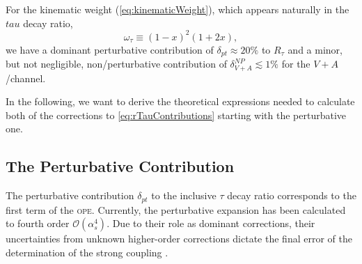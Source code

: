 \documentclass[../../index.tex]{subfiles}
\begin{document}
For the kinematic weight (\cref{eq:kinematicWeight}), which appears naturally in the \(tau\) decay ratio,
\begin{equation}
  \omega_\tau \equiv (1-x)^2(1+2x),
\end{equation}
we have a dominant perturbative contribution of \(\delta_{pt} \approx 20\%\) to
\(R_\tau\) \cite{Pich2013} and a minor, but not negligible, non\-/perturbative
contribution of \(\delta_{V+A}^{NP} \lesssim 1\% \) \cite{Jamin2013} for the
\(V+A\)\-/channel.

In the following, we want to derive the theoretical expressions needed to
calculate both of the corrections to \cref{eq:rTauContributions} starting with
the perturbative one.


\subsection{The Perturbative Contribution}
The perturbative contribution \(\delta_{pt}\) to the inclusive \(\tau\) decay
ratio corresponds to the first term of the \textsc{ope}. Currently, the
perturbative expansion has been calculated to fourth order
\(\mathcal{O}(\alpha_s^4)\). Due to their role as dominant corrections, their
uncertainties from unknown higher-order corrections dictate the final error of
the determination of the strong coupling \cite{Pich2016}.
\end{document}
